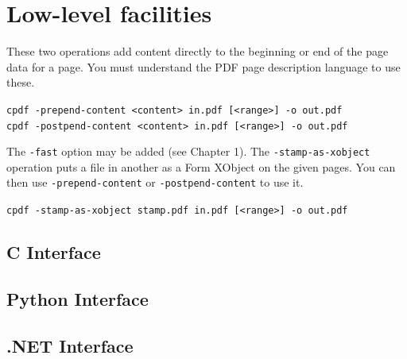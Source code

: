 \documentclass{book}
\begin{document}
\section{Low-level facilities}
\pagestyle{empty}\thispagestyle{fancy}
These two operations add content directly to the beginning or end of the page data for a page. You must understand the PDF page description language to use these.

\begin{framed}
  \noindent\small\verb!cpdf -prepend-content <content> in.pdf [<range>] -o out.pdf!\\

\vspace{1.5mm}
  \noindent\small\verb!cpdf -postpend-content <content> in.pdf [<range>] -o out.pdf!
\end{framed}

\noindent The \texttt{-fast} option may be added (see Chapter 1). The \texttt{-stamp-as-xobject} operation puts a file in another as a Form XObject on the given pages. You can then use \texttt{-prepend-content} or \texttt{-postpend-content} to use it.

\begin{framed}
  \noindent\small\verb!cpdf -stamp-as-xobject stamp.pdf in.pdf [<range>] -o out.pdf!
\end{framed}

\begin{cpdflib}
\clearpage
\section*{C Interface}
\begin{small}\tt

\end{small}
\end{cpdflib}

\begin{pycpdflib}
\clearpage
\section*{Python Interface}
\begin{small}\tt

\end{small}
\end{pycpdflib}

\begin{dotnetcpdflib}
\clearpage
\section*{.NET Interface}
\begin{small}\tt

\end{small}
\end{dotnetcpdflib}
\end{document}
